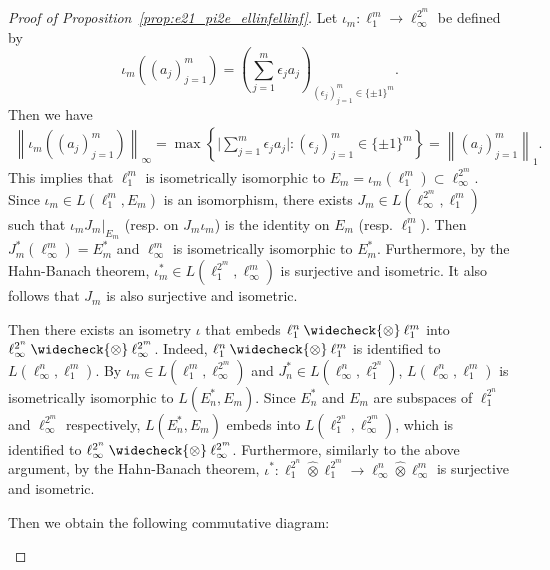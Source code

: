 \documentclass[11pt]{article}
\begin{document}
\begin{proof}[Proof of Proposition~\ref{prop:e21_pi2e_ellinfellinf}]
\newcommand\isom{\mathrel{\stackon[-0.1ex]{\makebox*{\scalebox{1.08}{\AC}}{=\hfill\llap{=}}}{{\AC}}}}
\newcommand\nvisom{\rotatebox[origin=cc] {-90}{$ \isom $}}
\newcommand\visom{\rotatebox[origin=cc] {90} {$ \isom $}}
Let $\iota_m: \ell_1^m \to \ell_\infty^{2^m}$ be defined by
\[
\iota_m\left((a_j)_{j=1}^m\right) = \left(\sum_{j=1}^m \epsilon_j a_j\right)_{(\epsilon_j)_{j=1}^m \in \{\pm 1\}^m}.
\]
Then we have
\begin{align*}
\left\|\iota_m((a_j)_{j=1}^m)\right\|_\infty
= \max \left\{ \bigg| \sum_{j=1}^m \epsilon_j a_j \bigg| : (\epsilon_j)_{j=1}^m \in \{\pm 1\}^m \right\} 
= \left\|(a_j)_{j=1}^m\right\|_1.
\end{align*}
This implies that $\ell_1^m$ is isometrically isomorphic to $E_m = \iota_m(\ell_1^m) \subset \ell_\infty^{2^m}$. Since $\iota_m \in L(\ell_1^m,E_m)$ is an isomorphism, there exists $J_m \in L(\ell_\infty^{2^m},\ell_1^m)$ such that $\iota_m J_m|_{E_m}$ (resp. on $J_m \iota_m$) is the identity on $E_m$ (resp. $\ell_1^m$). Then $J_m^*(\ell_\infty^m) = E_m^*$ and $\ell_\infty^m$ is isometrically isomorphic to $E_m^*$. Furthermore, by the Hahn-Banach theorem, $\iota_m^* \in L(\ell_1^{2^m},\ell_\infty^m)$ is surjective and isometric. It also follows that $J_m$ is also surjective and isometric.

Then there exists an isometry $\iota$ that embeds $\ell_1^n \mathbin{\widecheck{\otimes}} \ell_1^m$ into $\ell_\infty^{2^n} \mathbin{\widecheck{\otimes}} \ell_\infty^{2^m}$. Indeed, $\ell_1^n \mathbin{\widecheck{\otimes}} \ell_1^m$ is identified to $L(\ell_\infty^n, \ell_1^m)$. By $\iota_m \in L(\ell_1^m,\ell_\infty^{2^m})$ and $J_n^* \in L(\ell_\infty^n,\ell_1^{2^n})$, $L(\ell_\infty^n, \ell_1^m)$ is isometrically isomorphic to $L(E_n^*,E_m)$. Since $E_n^*$ and $E_m$ are subspaces of $\ell_1^{2^n}$ and $\ell_\infty^{2^m}$ respectively, $L(E_n^*,E_m)$ embeds into $L(\ell_1^{2^n}, \ell_\infty^{2^m})$, which is identified to $\ell_\infty^{2^n} \mathbin{\widecheck{\otimes}} \ell_\infty^{2^m}$. Furthermore, similarly to the above argument, by the Hahn-Banach theorem, $\iota^*: \ell_1^{2^n} \mathbin{\widehat{\otimes}} \ell_1^{2^m} \to \ell_\infty^n \mathbin{\widehat{\otimes}} \ell_\infty^m$ is surjective and isometric.

Then we obtain the following commutative diagram:
\begin{center}
\end{center}


\end{proof}
\end{document}

